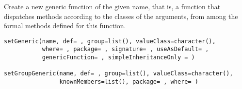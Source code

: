 %
\begin{Description}\relax
Create a new generic function of the given name, that is, a function
that dispatches methods according to the classes of the arguments,
from among the formal methods defined for this function.
\end{Description}
%
\begin{Usage}
\begin{verbatim}
setGeneric(name, def= , group=list(), valueClass=character(),
           where= , package= , signature= , useAsDefault= ,
           genericFunction= , simpleInheritanceOnly = )

setGroupGeneric(name, def= , group=list(), valueClass=character(),
                knownMembers=list(), package= , where= )
\end{verbatim}
\end{Usage}
%

